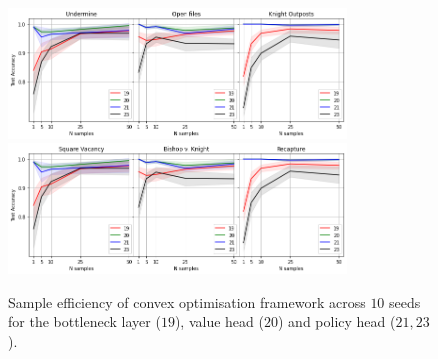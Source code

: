 \documentclass{article}
\begin{document}
\begin{figure}[ht] 
\centering
\caption{Sample efficiency of convex optimisation  framework across $10$ seeds for the bottleneck layer ($19$), value head ($20$) and policy head ($21, 23$).}
\includegraphics[width=0.8\textwidth]{images/sts123.png}
\includegraphics[width=0.8\textwidth]{images/sts456.png}
\label{fig:sample_efficiency_dataset2}
\end{figure}
\end{document}
